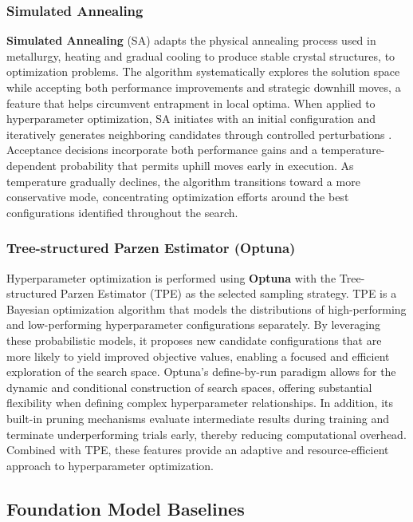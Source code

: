 \documentclass[12pt]{article}
\begin{document}
\subsubsection{Simulated Annealing}
\textbf{Simulated Annealing} (SA) adapts the physical annealing process used in metallurgy, heating and gradual cooling to produce stable crystal structures, to optimization problems. The algorithm systematically explores the solution space while accepting both performance improvements and strategic downhill moves, a feature that helps circumvent entrapment in local optima. When applied to hyperparameter optimization, SA initiates with an initial configuration and iteratively generates neighboring candidates through controlled perturbations \cite{saopt}. Acceptance decisions incorporate both performance gains and a temperature-dependent probability that permits uphill moves early in execution. As temperature gradually declines, the algorithm transitions toward a more conservative mode, concentrating optimization efforts around the best configurations identified throughout the search.

\subsubsection{Tree-structured Parzen Estimator (Optuna)}
Hyperparameter optimization is performed using \textbf{Optuna} with the Tree-structured Parzen Estimator (TPE) \cite{akiba2019optuna} as the selected sampling strategy. TPE is a Bayesian optimization algorithm that models the distributions of high-performing and low-performing hyperparameter configurations separately. By leveraging these probabilistic models, it proposes new candidate configurations that are more likely to yield improved objective values, enabling a focused and efficient exploration of the search space.
Optuna's define-by-run paradigm allows for the dynamic and conditional construction of search spaces, offering substantial flexibility when defining complex hyperparameter relationships. In addition, its built-in pruning mechanisms evaluate intermediate results during training and terminate underperforming trials early, thereby reducing computational overhead. Combined with TPE, these features provide an adaptive and resource-efficient approach to hyperparameter optimization.

\subsection{Foundation Model Baselines}
\label{sec:foundation_baselines}
\end{document}
